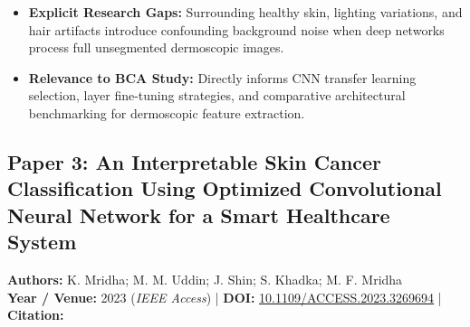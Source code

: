 \documentclass[11pt,a4paper]{article}
\begin{document}
\begin{itemize}
\item \textbf{Explicit Research Gaps:} Surrounding healthy skin, lighting variations, and hair artifacts introduce confounding background noise when deep networks process full unsegmented dermoscopic images.
\item \textbf{Relevance to BCA Study:} Directly informs CNN transfer learning selection, layer fine-tuning strategies, and comparative architectural benchmarking for dermoscopic feature extraction.
\end{itemize}

\subsection{Paper 3: An Interpretable Skin Cancer Classification Using Optimized Convolutional Neural Network for a Smart Healthcare System}
\textbf{Authors:} K. Mridha; M. M. Uddin; J. Shin; S. Khadka; M. F. Mridha \\
\textbf{Year / Venue:} 2023 (\textit{IEEE Access}) | \textbf{DOI:} \href{https://doi.org/10.1109/ACCESS.2023.3269694}{10.1109/ACCESS.2023.3269694} | \textbf{Citation:} \cite{10107401}
\end{document}
